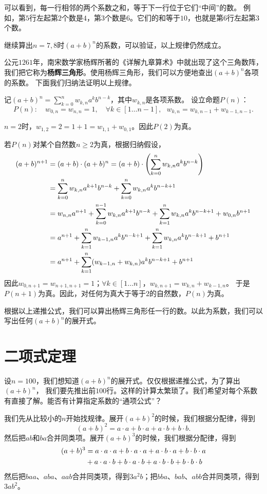 \documentclass[12pt,UTF8]{ctexbook}
\begin{document}
可以看到，每一行相邻的两个系数之和，等于下一行位于它们“中间”的数。
例如，第$5$行左起第$2$个数是$4$，第$3$个数是$6$。它们的和等于$10$，也就是第$6$行左起第$3$个数。

继续算出$n=7,8$时$(a+b)^n$的系数，可以验证，以上规律仍然成立。

公元$1261$年，南宋数学家杨辉所著的《详解九章算术》中就出现了这个三角数阵，
我们把它称为\textbf{杨辉三角形}。使用杨辉三角形，我们可以方便地查出$(a+b)^n$各项的系数。
下面我们归纳法证明以上规律。

记$(a+b)^n = \sum_{k=0}^n w_{k,n} a^k b^{n-k}$，其中$w_{k,n}$是各项系数。
设立命题$P(n)$：
$$P(n): \quad w_{0,n}=w_{n,n}=1, \quad \forall k\in[1\ldots n-1], \,\,\,\, w_{k,n} = w_{k,n-1} + w_{k-1,n-1}.$$

$n=2$时，$w_{1,2} = 2 = 1 + 1 = w_{1,1} + w_{0,1}$。因此$P(2)$为真。

若$P(n)$对某个自然数$n\geqslant 2$为真，根据归纳假设，
\begin{align}
 (a+b)^{n+1} &= (a+b)\cdot(a+b)^n = (a+b)\cdot\left(\sum_{k=0}^n w_{k,n} a^k b^{n-k}\right) \notag \\
  &= \sum_{k=0}^n w_{k,n} a^{k+1} b^{n-k} + \sum_{k=0}^n w_{k,n} a^k b^{n-k+1} \notag \\
  &= w_{n,n}a^{n+1} + \sum_{k=0}^{n-1} w_{k,n} a^{k+1} b^{n-k} + \sum_{k=1}^n w_{k,n} a^k b^{n-k+1} + w_{0,n}b^{n+1} \notag \\
  &= a^{n+1} + \sum_{k=1}^{n} w_{k-1,n} a^{k} b^{n-k+1} + \sum_{k=1}^n w_{k,n} a^k b^{n-k+1} + b^{n+1}\notag \\
  &= a^{n+1} + \sum_{k=1}^{n} (w_{k-1,n} + w_{k,n}) a^{k} b^{n-k+1} + b^{n+1} \notag
\end{align}
因此$w_{0,n+1}=w_{n+1,n+1}=1$；$\forall k\in[1\ldots n]$，$w_{k,n+1} = w_{k,n} + w_{k-1,n}$。
于是$P(n+1)$为真。因此，对任何为真大于等于$2$的自然数，$P(n)$为真。

根据以上递推公式，我们可以算出杨辉三角形任一行的数。以此为系数，我们可以写出任何$(a+b)^n$的展开式。

\section{二项式定理}

设$n=100$，我们想知道$(a+b)^n$的展开式。仅仅根据递推公式，为了算出$(a+b)^n$，
我们要先推出前$100$行。这样的计算太繁琐了。我们希望对每个系数有直接了解。能否有计算指定系数的“通项公式”？

我们先从比较小的$n$开始找规律。展开$(a+b)^2$的时候，我们根据分配律，得到
$$ (a+b)^2 = a\cdot a + b\cdot a + a\cdot b + b\cdot b. $$
然后把$ab$和$ba$合并同类项。展开$(a+b)^3$的时候，我们根据分配律，得到
\begin{align}
 (a+b)^3 &= a\cdot a\cdot a + b\cdot a\cdot a + a\cdot b\cdot a + b\cdot b\cdot a\notag \\
  &+ a\cdot a\cdot b + b\cdot a\cdot b + a\cdot b\cdot b + b\cdot b\cdot b \notag 
\end{align}
然后把$baa$、$aba$、$aab$合并同类项，得到$3a^2b$；把$bba$、$bab$、$abb$合并同类项，得到$3ab^2$。
\end{document}
